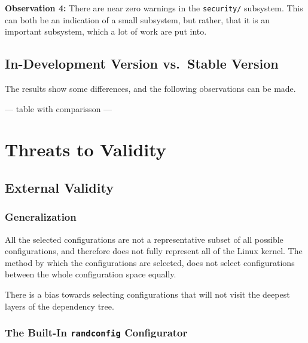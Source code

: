 \documentclass[a4paper,11pt]{report}
\begin{document}
\textbf{Observation 4:}
There are near zero warnings in the \texttt{security/} subsystem. This can both 
be an indication of a small subsystem, but rather, that it is an important 
subsystem, which a lot of work are put into. 




            \section{In-Development Version vs.\ Stable Version}


The results show some differences, and the following observations can be made.

--- table with comparisson ---







            \newpage
            \chapter{Threats to Validity}
            \label{ch:ttv}


            \section{External Validity}
            \label{sec:extval}

            \subsection{Generalization}
            \label{sec:consel}

All the selected configurations are not a representative subset of all possible
configurations, and therefore does not fully represent all of the Linux kernel. 
The method by which the configurations are selected, does not select 
configurations between the whole configuration space equally.

There is a bias towards selecting configurations that will not visit the 
deepest layers of the dependency tree.

            \subsection{The Built-In \texttt{randconfig} Configurator}
            \label{sec:randconfbias}
\end{document}
